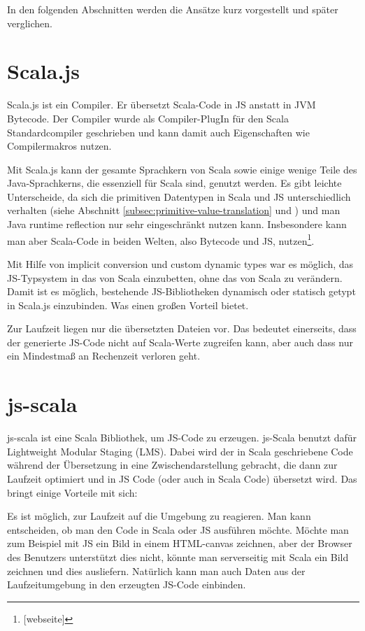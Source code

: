 \documentclass[12pt,bibtotoc]{scrreprt}
\begin{document}
In den folgenden Abschnitten werden die Ansätze kurz vorgestellt und später verglichen.

\section{Scala.js}
\label{sec:scala-js}

Scala.js ist ein Compiler. Er übersetzt Scala-Code in JS anstatt in JVM Bytecode\cite{Doeraene2013}. Der Compiler wurde als Compiler-PlugIn für den Scala Standardcompiler geschrieben und kann damit auch Eigenschaften wie Compilermakros nutzen. 

Mit Scala.js kann der gesamte Sprachkern von Scala sowie einige wenige Teile des Java-Sprachkerns, die essenziell für Scala sind, genutzt werden. Es gibt leichte Unterscheide, da sich die primitiven Datentypen in Scala und JS unterschiedlich verhalten (siehe Abschnitt \ref{subsec:primitive-value-translation} und \cite{Doeraene2014}) und man Java runtime reflection nur sehr eingeschränkt nutzen kann. Insbesondere kann man aber Scala-Code in beiden Welten, also Bytecode und JS, nutzen\footnote{[webseite]}. 

Mit Hilfe von implicit conversion und custom dynamic types war es möglich, das JS-Typsystem in das von Scala einzubetten, ohne das von Scala zu verändern. Damit ist es möglich, bestehende JS-Bibliotheken dynamisch oder statisch getypt in Scala.js einzubinden. Was einen großen Vorteil bietet. 

Zur Laufzeit liegen nur die übersetzten Dateien vor. Das bedeutet einerseits, dass der generierte JS-Code nicht auf Scala-Werte zugreifen kann, aber auch dass nur ein Mindestmaß an Rechenzeit verloren geht.

\section{js-scala}

js-scala ist eine Scala Bibliothek, um JS-Code zu erzeugen\cite{Kossakowski2012}. js-Scala benutzt dafür Lightweight Modular Staging (LMS)\cite{Rompf2010}. Dabei wird der in Scala geschriebene Code während der Übersetzung in eine Zwischendarstellung gebracht, die dann zur Laufzeit optimiert und in JS Code (oder auch in Scala Code) übersetzt wird. Das bringt einige Vorteile mit sich: 

Es ist möglich, zur Laufzeit auf die Umgebung zu reagieren. Man kann entscheiden, ob man den Code in Scala oder JS ausführen möchte. Möchte man zum Beispiel mit JS ein Bild in einem HTML-canvas zeichnen, aber der Browser des Benutzers unterstützt dies nicht, könnte man serverseitig mit Scala ein Bild zeichnen und dies ausliefern. Natürlich kann man auch Daten aus der Laufzeitumgebung in den erzeugten JS-Code einbinden.
\end{document}
